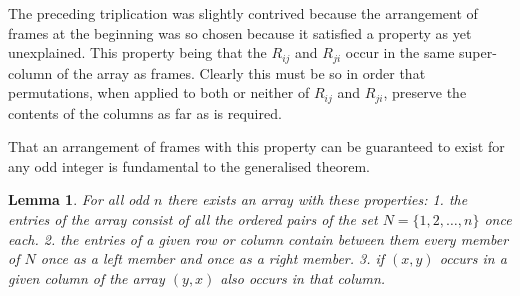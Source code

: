 \documentclass[
  11pt,
  a4paper]{book}
\newtheorem{lemma}[theorem]{Lemma}
\begin{document}
The preceding triplication was slightly contrived because
the arrangement of frames at the beginning was so chosen
because it satisfied a property as yet unexplained. This
property being that the \(R_{ij}\) and \(R_{ji}\) occur in the
same super-column of the array as frames. Clearly this must
be so in order that permutations, when applied to both or
neither of \(R_{ij}\) and \(R_{ji}\), preserve the contents of
the columns as far as is required.

That an arrangement of frames with this property can be
guaranteed to exist for any odd integer is fundamental to
the generalised theorem.

\begin{lemma}
For all odd $n$ there exists an array with these properties:
  1. the entries of the array consist of all the ordered
     pairs of the set $N = \{1, 2, \ldots, n\}$ once each.
  2. the entries of a given row or column contain between
     them every member of $N$ once as a left member and
     once as a right member.
  3. if $(x,y)$ occurs in a given column of the array
     $(y,x)$ also occurs in that column.
\end{lemma}
\end{document}

